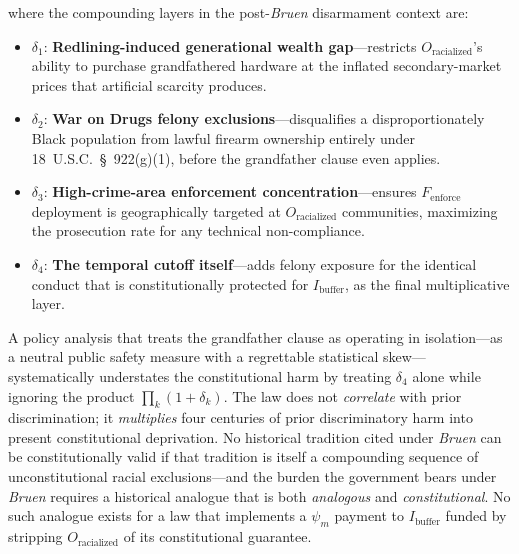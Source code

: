 where the compounding layers in the post-\textit{Bruen} disarmament context are:

\begin{itemize}
    \item $\delta_1$: \textbf{Redlining-induced generational wealth gap}---restricts $O_{\text{racialized}}$'s ability to purchase grandfathered hardware at the inflated secondary-market prices that artificial scarcity produces.
    \item $\delta_2$: \textbf{War on Drugs felony exclusions}---disqualifies a disproportionately Black population from lawful firearm ownership entirely under 18~U.S.C.~\S~922(g)(1), before the grandfather clause even applies.
    \item $\delta_3$: \textbf{High-crime-area enforcement concentration}---ensures $F_{\text{enforce}}$ deployment is geographically targeted at $O_{\text{racialized}}$ communities, maximizing the prosecution rate for any technical non-compliance.
    \item $\delta_4$: \textbf{The temporal cutoff itself}---adds felony exposure for the identical conduct that is constitutionally protected for $I_{\text{buffer}}$, as the final multiplicative layer.
\end{itemize}

A policy analysis that treats the grandfather clause as operating in isolation---as a neutral public safety measure with a regrettable statistical skew---systematically understates the constitutional harm by treating $\delta_4$ alone while ignoring the product $\prod_k(1 + \delta_k)$. The law does not \textit{correlate} with prior discrimination; it \textit{multiplies} four centuries of prior discriminatory harm into present constitutional deprivation. No historical tradition cited under \textit{Bruen} can be constitutionally valid if that tradition is itself a compounding sequence of unconstitutional racial exclusions---and the burden the government bears under \textit{Bruen} requires a historical analogue that is both \textit{analogous} and \textit{constitutional}. No such analogue exists for a law that implements a $\psi_m$ payment to $I_{\text{buffer}}$ funded by stripping $O_{\text{racialized}}$ of its constitutional guarantee.

